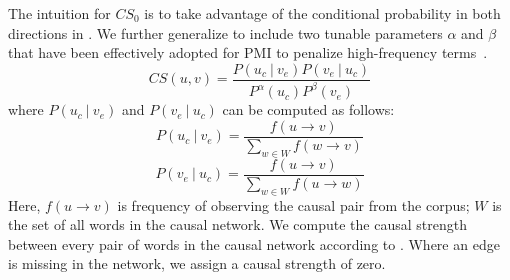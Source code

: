 The intuition for $CS_0$ is to take advantage of the conditional
probability in both directions in .
We further generalize  to include two tunable parameters
$\alpha$ and $\beta$ that have been effectively adopted for PMI
to penalize high-frequency terms~\cite{Church:assoc}.
\begin{equation}
CS(u,v) = \frac{P(u_c~|~v_e) P(v_e~|~u_c)}
{P^\alpha(u_c)P^\beta(v_e)}\label{eq:cpmi}
\end{equation}
where
$P(u_c~|~v_e)$ and $P(v_e~|~u_c)$ can be computed as follows:
\begin{equation}
P(u_c~|~v_e) = \frac{f(u \rightarrow v)}{\sum_{w\in W}
f (w\rightarrow v)}
\end{equation}
\begin{equation}
P(v_e~|~u_c) = \frac{f(u\rightarrow v)}{\sum_{w\in W}
f(u\rightarrow w)}
\end{equation}
Here, $f(u\rightarrow v)$ is frequency of observing the causal pair
from the corpus; $W$ is the set of all words in the causal network.
We compute the causal strength between every pair of words in the causal network
according to . Where an edge is missing in the network, we assign
a causal strength of zero.


